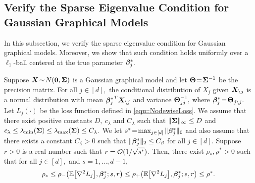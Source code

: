 \documentclass[twoside,11pt]{article}
\newcommand*{\bbetas}{\bbeta^*}
\newcommand*{\bbetass}{\bbeta^*_{j}}
\begin{document}
\subsection{Verify the Sparse Eigenvalue Condition for Gaussian Graphical Models}\label{sec::Sparse_Eig_GGM}
In this subsection, we verify the sparse eigenvalue condition for Gaussian graphical models. Moreover, we show that such condition holds uniformly over a $\ell_1$-ball centered at the true parameter $\bm{\beta}_j^*$.
\begin{proposition}\label{prop::SparseEigGGM}
 Suppose $\bm{X}\! \sim\! N({\bf 0},\bm{\Sigma})$ is a Gaussian graphical model and  let $\bm{\Theta}\! =\! \bm{\Sigma}^{-1}$ be the precision matrix.  For all $j \in [d],$ the conditional distribution of $X_j$ given $\bm{X}_{\setminus j}$ is a normal distribution with mean ${\bbetass}^T \bX_{\setminus j}$ and variance $\bm{\Theta}_{jj}^{-1},$ where $\bbetas_j \!=\! \bTheta_{j\setminus j}.$  Let $L_j(\cdot)$ be the loss function defined in \eqref{equ::NodewiseLoss}. We   assume that  there exist positive constants $D,\  c_{\lambda}$ and $C_{\lambda} $ such that  $  \| \bm{\Sigma}  \|_\infty \leq D$ and  $c_\lambda \leq \lambda_{\min}(\bm{\Sigma} ) \leq \lambda_{\max} (\bm{\Sigma}) \leq C _ \lambda.$   We let $s^* \! = \! \max_{j\in[d]} \| \bbetass \|_0 $ and  also assume that  there exists a constant $C_{\beta}>0$ such that $  \| \bbetass   \| _2 \leq C _\beta$  for all $j\in [d].$ Suppose $r>0$ is a real number such that $r = \mathcal{O}( 1/\sqrt{s^*})$. Then, there exist $\rho_*, \rho^* >0$ such that   for all $j\in [d],$ and $s = 1,\ldots,d-1,$
 \begin{align*}
 \rho_*  \leq \rho_{-}\bigl(\EE \bigl[\nabla^2 L_j \bigr], \bbetass ; s,r\bigr) \leq \rho_{+}\bigl(\EE  \bigl[\nabla^2 L_j \bigr], \bbetass ; s,r\bigr) \leq \rho^*.
 \end{align*}
 \end{proposition}
\end{document}
